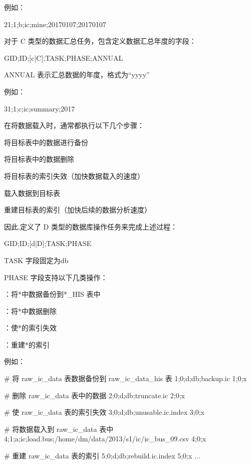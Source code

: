 例如：
\begin{examplecode}
21;1;b;ic;mine;20170107;20170107
\end{examplecode}

对于 C 类型的数据汇总任务，包含定义数据汇总年度的字段：
\begin{scriptcode}
GID;ID;[c|C];TASK;PHASE;ANNUAL
\end{scriptcode}
\begin{para}
\item[ANNUAL] 表示汇总数据的年度，格式为“yyyy”
\end{para}

例如：
\begin{examplecode}
31;1;c;ic;summary;2017
\end{examplecode}

在将数据载入时，通常都执行以下几个步骤：
\begin{nbeae}
\item 将目标表中的数据进行备份
\item 将目标表中的数据删除
\item 将目标表的索引失效（加快数据载入的速度）
\item 载入数据到目标表
\item 重建目标表的索引（加快后续的数据分析速度）
\end{nbeae}

因此,定义了 D 类型的数据库操作任务来完成上述过程：
\begin{scriptcode}
GID;ID;[d|D];TASK;PHASE
\end{scriptcode}
\begin{para}
\item[TASK] 字段固定为db
\item[PHASE] 字段支持以下几类操作：
\begin{cit}
\item {}：将*中数据备份到*\_HIS 表中
\item {}：将*中数据删除
\item {}：使*的索引失效
\item {}：重建*的索引
\end{cit}
\end{para}

例如：
\begin{examplecode}
# 将 raw_ic_data 表数据备份到 raw_ic_data_his 表
1;0;d;db;backup.ic
1;0;x

# 删除 raw_ic_data 表中的数据
2;0;d;db;truncate.ic
2;0;x

# 使 raw_ic_data 表的索引失效
3;0;d;db;unusable.ic.index
3;0;x

# 将数据载入到 raw_ic_data 表中
4;1;a;ic;load.bus;/home/dm/data/2013/s1/ic/ic_bus_09.csv
4;0;x

# 重建 raw_ic_data 表的索引
5;0;d;db;rebuild.ic.index
5;0;x
...
\end{examplecode}

